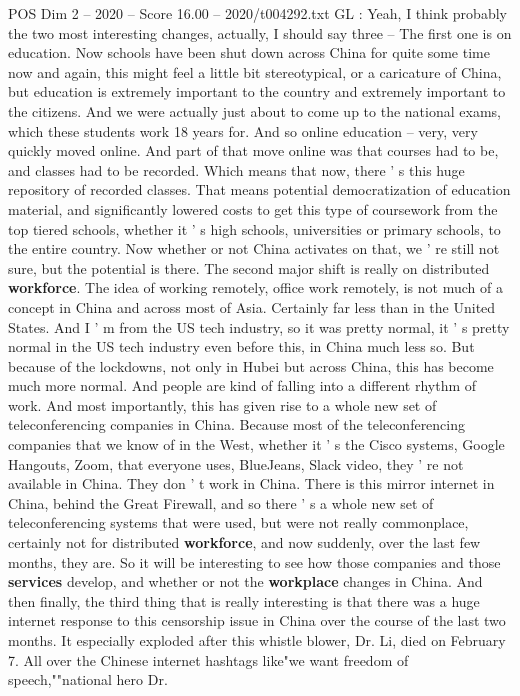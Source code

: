 \begin{textsample}{POS Dim 2 – 2020 – Score 16.00 – 2020/t004292.txt}
GL : Yeah, I think probably the two most interesting changes, actually, I should say three -- The first one is on education.
Now schools have been shut down across China for quite some time now and again, this might feel a little bit stereotypical, or a caricature of China, but education is extremely important to the country and extremely important to the citizens.
And we were actually just about to come up to the national exams, which these students work 18 years for.
And so online education -- very, very quickly moved online.
And part of that move online was that courses had to be, and classes had to be recorded.
Which means that now, there ' s this huge repository of recorded classes.
That means potential democratization of education material, and significantly lowered costs to get this type of coursework from the top tiered schools, whether it ' s high schools, universities or primary schools, to the entire country.
Now whether or not China activates on that, we ' re still not sure, but the potential is there.
The second major shift is really on distributed \textbf{workforce}.
The idea of working remotely, office work remotely, is not much of a concept in China and across most of Asia.
Certainly far less than in the United States.
And I ' m from the US tech industry, so it was pretty normal, it ' s pretty normal in the US tech industry even before this, in China much less so.
But because of the lockdowns, not only in Hubei but across China, this has become much more normal.
And people are kind of falling into a different rhythm of work.
And most importantly, this has given rise to a whole new set of teleconferencing companies in China.
Because most of the teleconferencing companies that we know of in the West, whether it ' s the Cisco systems, Google Hangouts, Zoom, that everyone uses, BlueJeans, Slack video, they ' re not available in China.
They don ' t work in China.
There is this mirror internet in China, behind the Great Firewall, and so there ' s a whole new set of teleconferencing systems that were used, but were not really commonplace, certainly not for distributed \textbf{workforce}, and now suddenly, over the last few months, they are.
So it will be interesting to see how those companies and those \textbf{services} develop, and whether or not the \textbf{workplace} changes in China.
And then finally, the third thing that is really interesting is that there was a huge internet response to this censorship issue in China over the course of the last two months.
It especially exploded after this whistle blower, Dr.
Li, died on February 7.
All over the Chinese internet hashtags like"we want freedom of speech,""national hero Dr.

\end{textsample}
